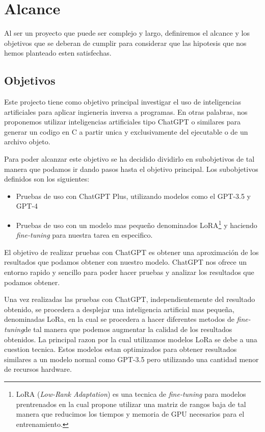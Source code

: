 \chapter{Alcance}
\label{cap:alcance}

Al ser un proyecto que puede ser complejo y largo, definiremos el alcance y los objetivos que se deberan de cumplir para considerar que las hipotesis que nos
hemos planteado esten satisfechas. 

\section{Objetivos}
\label{sec:objetivos}

Este projecto tiene como objetivo principal investigar el uso de inteligencias artificiales para aplicar ingieneria inversa a programas. 
En otras palabras, nos proponemos utilizar inteligencias artificiales tipo ChatGPT o similares para generar un codigo en C a partir unica
y exclusivamente del ejecutable o de un archivo objeto.

Para poder alcanzar este objetivo se ha decidido dividirlo en subobjetivos de tal manera que podamos ir dando pasos hasta el objetivo principal.
Los subobjetivos definidos son los siguientes:

\begin{itemize}
    \item Pruebas de uso con ChatGPT Plus, utilizando modelos como el GPT-3.5 y GPT-4
    \item Pruebas de uso con un modelo mas pequeño denominados LoRA\footnote{LoRA (\textit{Low-Rank Adaptation}) es una tecnica de \textit{fine-tuning} para modelos
          prentrenados en la cual propone utilizar una matriz de rangos baja de tal manera que reducimos los tiempos y memoria de GPU necesarios para el entrenamiento.} 
          y haciendo \textit{fine-tuning} para nuestra tarea en especifico.
\end{itemize}

El objetivo de realizar pruebas con ChatGPT es obtener una aproximación de los resultados que podamos obtener con nuestro modelo. ChatGPT nos
ofrece un entorno rapido y sencillo para poder hacer pruebas y analizar los resultados que podamos obtener.

Una vez realizadas las pruebas con ChatGPT, independientemente del resultado obtenido, se procedera a desplejar una inteligencia artificial mas pequeña,
denominadas LoRa, en la cual se procedera a hacer diferentes metodos de \textit{fine-tuning}de tal manera que podemos augmentar la calidad de los resultados
obtenidos. La principal razon por la cual utilizamos modelos LoRa se debe a una cuestion tecnica. Estos modelos estan optimizados para obtener resultados
similares a un modelo normal como GPT-3.5 pero utilizando una cantidad menor de recursos hardware.

